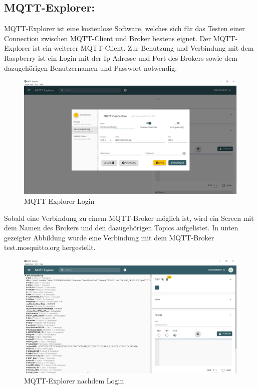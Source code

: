 \subsection{MQTT-Explorer:}
MQTT-Explorer ist eine kostenlose Software, welches sich für das Testen einer Connection zwischen MQTT-Client und Broker bestens eignet.
Der MQTT-Explorer ist ein weiterer MQTT-Client.
Zur Benutzung und Verbindung mit dem Raspberry ist ein Login mit der Ip-Adresse und Port des Brokers sowie dem dazugehörigen Benutzernamen und Passwort notwendig.

\begin{figure}[H]
    \centering
    \includegraphics[width=1\textwidth]{pics/MQTTExplorerStartScreen.JPG}
    \caption{MQTT-Explorer Login}
\end{figure}


 Sobald eine Verbindung zu einem MQTT-Broker möglich ist, wird ein Screen mit dem Namen des Brokers und den dazugehörigen Topics aufgelistet. 
 In unten gezeigter Abbildung wurde eine Verbindung mit dem MQTT-Broker test.mosquitto.org hergestellt.  

 \begin{figure}[H]
    \centering
    \includegraphics[width=1\textwidth]{pics/MQTTExplorerTestDemo.JPG}
    \caption{MQTT-Explorer nachdem Login}
\end{figure}








